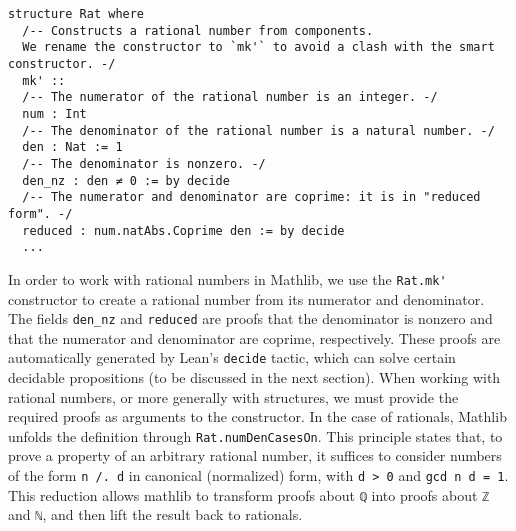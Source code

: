 \begin{lstlisting}[language=lean]
  structure Rat where
  /-- Constructs a rational number from components.
  We rename the constructor to `mk'` to avoid a clash with the smart constructor. -/
  mk' ::
  /-- The numerator of the rational number is an integer. -/
  num : Int
  /-- The denominator of the rational number is a natural number. -/
  den : Nat := 1
  /-- The denominator is nonzero. -/
  den_nz : den ≠ 0 := by decide
  /-- The numerator and denominator are coprime: it is in "reduced form". -/
  reduced : num.natAbs.Coprime den := by decide
  ...
\end{lstlisting}
In order to work with rational numbers in Mathlib, we use the
\lstinline[language=lean]|Rat.mk'| constructor to create a rational number from
its numerator and denominator.
The fields \lstinline[language=lean]|den_nz| and \lstinline[language=lean]|reduced| are proofs that 
the denominator is nonzero and that the numerator and denominator are coprime, respectively. 
These proofs are automatically generated by Lean's \lstinline[language=lean]|decide| tactic, which can 
solve certain decidable propositions (to be discussed in the next section).
When working with rational numbers, or more generally with structures, we must provide the 
required proofs as arguments to the constructor.
In the case of rationals, Mathlib unfolds the definition through
\lstinline[language=lean]|Rat.numDenCasesOn|. This principle states that, to prove a property of an 
arbitrary rational number, it suffices to consider numbers of the form \lstinline[language=lean]|n /. d| 
in canonical (normalized) form, with \lstinline[language=lean]|d > 0| and \lstinline[language=lean]|gcd n d = 1|.
This reduction allows mathlib to transform proofs about \lstinline[language=lean]|ℚ| 
into proofs about \lstinline[language=lean]|ℤ| and \lstinline[language=lean]|ℕ|, 
and then lift the result back to rationals.
